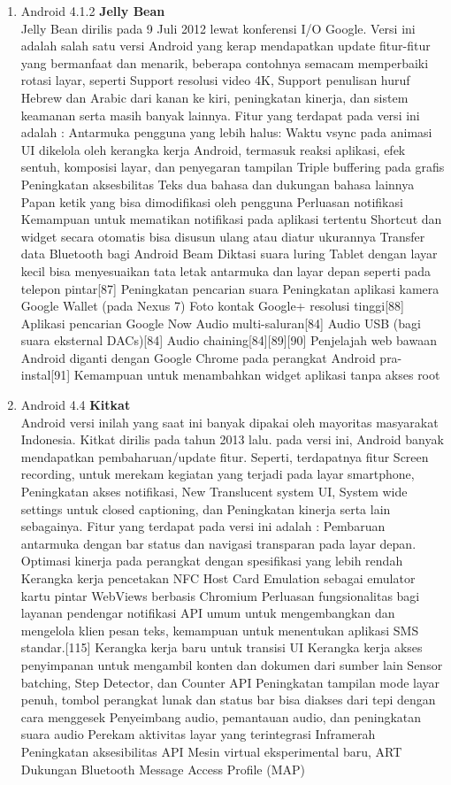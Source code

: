 \begin{enumerate}
\item Android 4.1.2 \textbf{Jelly Bean}\\
Jelly Bean dirilis pada 9 Juli 2012 lewat konferensi I/O Google. Versi ini adalah salah satu versi Android yang kerap mendapatkan update fitur-fitur yang bermanfaat dan menarik, beberapa contohnya semacam memperbaiki rotasi layar, seperti Support resolusi video 4K, Support penulisan huruf Hebrew dan Arabic dari kanan ke kiri, peningkatan kinerja, dan sistem keamanan serta masih banyak lainnya. Fitur yang terdapat pada versi ini adalah : 
Antarmuka pengguna yang lebih halus:
Waktu vsync pada animasi UI dikelola oleh kerangka kerja Android, termasuk reaksi aplikasi, efek sentuh, komposisi layar, dan penyegaran tampilan
Triple buffering pada grafis
Peningkatan aksesbilitas
Teks dua bahasa dan dukungan bahasa lainnya
Papan ketik yang bisa dimodifikasi oleh pengguna
Perluasan notifikasi
Kemampuan untuk mematikan notifikasi pada aplikasi tertentu
Shortcut dan widget secara otomatis bisa disusun ulang atau diatur ukurannya
Transfer data Bluetooth bagi Android Beam
Diktasi suara luring
Tablet dengan layar kecil bisa menyesuaikan tata letak antarmuka dan layar depan seperti pada telepon pintar[87]
Peningkatan pencarian suara
Peningkatan aplikasi kamera
Google Wallet (pada Nexus 7)
Foto kontak Google+ resolusi tinggi[88]
Aplikasi pencarian Google Now
Audio multi-saluran[84]
Audio USB (bagi suara eksternal DACs)[84]
Audio chaining[84][89][90]
Penjelajah web bawaan Android diganti dengan Google Chrome pada perangkat Android pra-instal[91]
Kemampuan untuk menambahkan widget aplikasi tanpa akses root

\item Android 4.4 \textbf{Kitkat}\\
Android versi inilah yang saat ini banyak dipakai oleh mayoritas masyarakat Indonesia. Kitkat dirilis pada tahun 2013 lalu. pada versi ini, Android banyak mendapatkan pembaharuan/update fitur. Seperti, terdapatnya fitur Screen recording, untuk merekam kegiatan yang terjadi pada layar smartphone, Peningkatan akses notifikasi, New Translucent system UI, System wide settings untuk closed captioning, dan Peningkatan kinerja serta lain sebagainya. Fitur yang terdapat pada versi ini adalah : 
Pembaruan antarmuka dengan bar status dan navigasi transparan pada layar depan.
Optimasi kinerja pada perangkat dengan spesifikasi yang lebih rendah
Kerangka kerja pencetakan
NFC Host Card Emulation sebagai emulator kartu pintar
WebViews berbasis Chromium
Perluasan fungsionalitas bagi layanan pendengar notifikasi
API umum untuk mengembangkan dan mengelola klien pesan teks, kemampuan untuk menentukan aplikasi SMS standar.[115]
Kerangka kerja baru untuk transisi UI
Kerangka kerja akses penyimpanan untuk mengambil konten dan dokumen dari sumber lain
Sensor batching, Step Detector, dan Counter API
Peningkatan tampilan mode layar penuh, tombol perangkat lunak dan status bar bisa diakses dari tepi dengan cara menggesek
Penyeimbang audio, pemantauan audio, dan peningkatan suara audio
Perekam aktivitas layar yang terintegrasi
Inframerah
Peningkatan aksesibilitas API
Mesin virtual eksperimental baru, ART
Dukungan Bluetooth Message Access Profile (MAP)


\end{enumerate}
